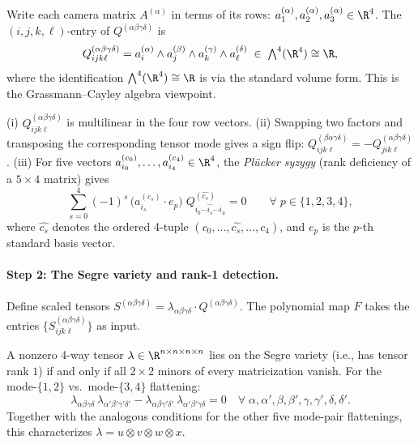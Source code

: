 Write each camera matrix $A^{(\alpha)}$ in terms of its rows:
$a^{(\alpha)}_1, a^{(\alpha)}_2, a^{(\alpha)}_3 \in \R^4$.
The $(i,j,k,\ell)$-entry of $Q^{(\alpha\beta\gamma\delta)}$ is
\begin{equation}\label{eq:p9-wedge}
  Q^{(\alpha\beta\gamma\delta)}_{ijk\ell}
  = a^{(\alpha)}_i \wedge a^{(\beta)}_j \wedge a^{(\gamma)}_k \wedge a^{(\delta)}_\ell
  \;\in\; \textstyle\bigwedge^4(\R^4) \cong \R,
\end{equation}
where the identification $\bigwedge^4(\R^4)\cong \R$ is via the standard volume form.
This is the Grassmann--Cayley algebra viewpoint.

\begin{remark}\label{rem:p9-antisym}
(i) $Q^{(\alpha\beta\gamma\delta)}_{ijk\ell}$ is multilinear in the four row vectors.
(ii) Swapping two factors and transposing the corresponding tensor mode
gives a sign flip: $Q^{(\beta\alpha\gamma\delta)}_{ijk\ell} = -Q^{(\alpha\beta\gamma\delta)}_{jik\ell}$.
(iii) For five vectors $a^{(c_0)}_{i_0},\ldots,a^{(c_4)}_{i_4}\in\R^4$,
the \emph{Pl\"ucker syzygy} (rank deficiency of a $5\times 4$ matrix) gives
\begin{equation}\label{eq:p9-plucker}
  \sum_{s=0}^{4}(-1)^s\,\bigl(a^{(c_s)}_{i_s}\cdot e_p\bigr)\;
  Q^{(\widehat{c_s})}_{i_0\cdots\widehat{i_s}\cdots i_4} = 0
  \qquad \forall\; p\in\{1,2,3,4\},
\end{equation}
where $\widehat{c_s}$ denotes the ordered 4-tuple $(c_0,\ldots,\widehat{c_s},\ldots,c_4)$,
and $e_p$ is the $p$-th standard basis vector.
\end{remark}

\paragraph{Step 2: The Segre variety and rank-1 detection.}

Define scaled tensors $S^{(\alpha\beta\gamma\delta)} = \lambda_{\alpha\beta\gamma\delta}\cdot Q^{(\alpha\beta\gamma\delta)}$.
The polynomial map $F$ takes the entries $\{S^{(\alpha\beta\gamma\delta)}_{ijk\ell}\}$ as input.

\begin{lemma}\label{lem:p9-segre}
A nonzero 4-way tensor $\lambda\in\R^{n\times n\times n\times n}$ lies on the
Segre variety (i.e., has tensor rank $1$) if and only if all $2\times 2$ minors
of every matricization vanish. For the mode-$\{1,2\}$ vs.\ mode-$\{3,4\}$ flattening:
\begin{equation}\label{eq:p9-minor}
  \lambda_{\alpha\beta\gamma\delta}\,\lambda_{\alpha'\beta'\gamma'\delta'}
  - \lambda_{\alpha\beta\gamma'\delta'}\,\lambda_{\alpha'\beta'\gamma\delta} = 0
  \quad\forall\;\alpha,\alpha',\beta,\beta',\gamma,\gamma',\delta,\delta'.
\end{equation}
Together with the analogous conditions for the other five mode-pair flattenings,
this characterizes $\lambda = u\otimes v\otimes w\otimes x$.
\end{lemma}


